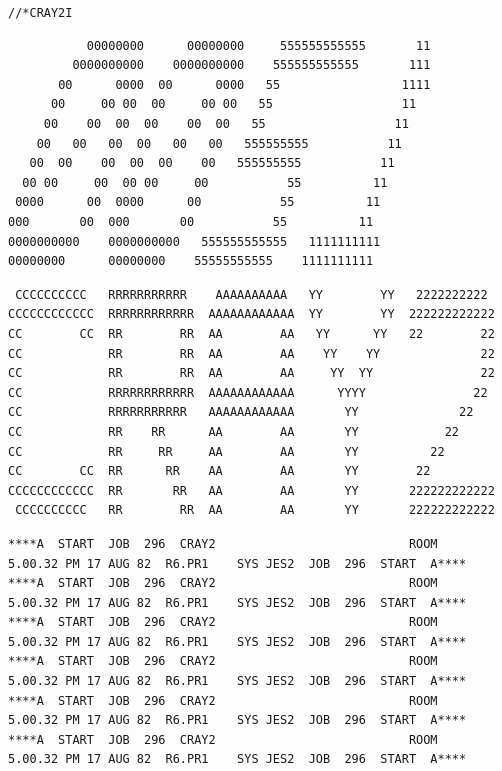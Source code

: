 
\texttt{//*\quad CRAY2\qquad I}

{\scriptsize
\begin{verbatim}
           00000000      00000000     555555555555       11
         0000000000    0000000000    555555555555       111
       00      0000  00      0000   55                 1111
      00     00 00  00     00 00   55                  11
     00    00  00  00    00  00   55                  11
    00   00   00  00   00   00   555555555           11
   00  00    00  00  00    00   555555555           11
  00 00     00  00 00     00           55          11
 0000      00  0000      00           55          11
000       00  000       00           55          11
0000000000    0000000000   555555555555   1111111111
00000000      00000000    55555555555    1111111111
\end{verbatim}
}

{\scriptsize\begin{verbatim}
 CCCCCCCCCC   RRRRRRRRRRR    AAAAAAAAAA   YY        YY   2222222222
CCCCCCCCCCCC  RRRRRRRRRRRR  AAAAAAAAAAAA  YY        YY  222222222222
CC        CC  RR        RR  AA        AA   YY      YY   22        22
CC            RR        RR  AA        AA    YY    YY              22
CC            RR        RR  AA        AA     YY  YY               22
CC            RRRRRRRRRRRR  AAAAAAAAAAAA      YYYY               22
CC            RRRRRRRRRRR   AAAAAAAAAAAA       YY              22
CC            RR    RR      AA        AA       YY            22
CC            RR     RR     AA        AA       YY          22
CC        CC  RR      RR    AA        AA       YY        22
CCCCCCCCCCCC  RR       RR   AA        AA       YY       222222222222
 CCCCCCCCCC   RR        RR  AA        AA       YY       222222222222
\end{verbatim}
}

{\fontsize{4.5}{5.9}\selectfont
\begin{verbatim}
****A  START  JOB  296  CRAY2                           ROOM        5.00.32 PM 17 AUG 82  R6.PR1    SYS JES2  JOB  296  START  A****
****A  START  JOB  296  CRAY2                           ROOM        5.00.32 PM 17 AUG 82  R6.PR1    SYS JES2  JOB  296  START  A****
****A  START  JOB  296  CRAY2                           ROOM        5.00.32 PM 17 AUG 82  R6.PR1    SYS JES2  JOB  296  START  A****
****A  START  JOB  296  CRAY2                           ROOM        5.00.32 PM 17 AUG 82  R6.PR1    SYS JES2  JOB  296  START  A****
****A  START  JOB  296  CRAY2                           ROOM        5.00.32 PM 17 AUG 82  R6.PR1    SYS JES2  JOB  296  START  A****
****A  START  JOB  296  CRAY2                           ROOM        5.00.32 PM 17 AUG 82  R6.PR1    SYS JES2  JOB  296  START  A****
\end{verbatim}
}

